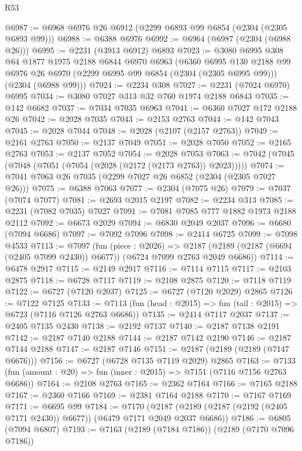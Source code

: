 \begin{lexlean}{R53}
\begin{coremodule}
@6987 := @6968 @6976 @26 @6912 (@2299 @6893 @99 @6854 (@2304 (@2305 @6893 @99)))
@6988 := @6388 @6976
@6992 := @6964 (@6987 (@2304 (@6988 @26)))
@6995 := @2231 (@3913 @6912) @6893
@7023 := @3080
    @6995
    @308
    @64
    @1877
    @1975
    @2188
    @6844
    @6970
    @6963
    (@6360
      @6995
      @130
      @2188
      @99
      @6976
      @26
      @6970
      (@2299 @6995 @99 @6854 (@2304 (@2305 @6995 @99)))
      (@2304 (@6988 @99)))
@7024 := @2234 @308
@7027 := @2231 (@7024 @6970) @6995
@7034 := @3080 @7027 @313 @32 @760 @1974 @2188 @6843
@7035 := @142 @6682
@7037 := @7034 @7035 @6963
@7041 := @6360 @7027 @172 @2188 @26
@7042 := @2028 @7035
@7043 := @2153 @2763
@7044 := @142 @7043
@7045 := @2028 @7044
@7048 := @2028 (@2107 (@2157 @2763))
@7049 := @2161 @2763
@7050 := @2137 @7049
@7051 := @2028 @7050
@7052 := @2165 @2763
@7053 := @2137 @7052
@7054 := @2028 @7053
@7063 := @7042 (@7045 (@7048 (@7051 (@7054 (@2028 (@2172 (@2173 @2763)) @2023)))))
@7074 := @7041 @7063 @26 @7035 (@2299 @7027 @26 @6852 (@2304 (@2305 @7027 @26)))
@7075 := @6388 @7063
@7077 := @2304 (@7075 @26)
@7079 := @7037 (@7074 @7077)
@7081 := @2693 @2015 @2197
@7082 := @2234 @313
@7085 := @2231 (@7082 @7035) @7027
@7091 := @7081 @7085 @777 @1882 @1973 @2188 @2112
@7092 := @6673 @2029
@7094 := @6830 @2049 @2037
@7096 := @6680 (@7094 @6686)
@7097 := @7092 @7096
@7098 := @2414 @6725
@7099 := @7098 @4533
@7113 := @7097
    (fun (piece : @2026) =>
    @2187 (@2189 (@2187 (@6694 (@2405 @7099 @2430)) @6677)) (@6724 @7099 @2763 @2049 @6686))
@7114 := @6478 @2917
@7115 := @2149 @2917
@7116 := @7114 @7115
@7117 := @2103 @2875
@7118 := @6728 @7117
@7119 := @2108 @2875
@7120 := @7118 @7119
@7122 := @6727 (@7120 @2037)
@7125 := @6727 (@7120 @2029) @2865
@7126 := @7122 @7125
@7133 := @7113 (fun (head : @2015) => fun (tail : @2015) => @6723 (@7116 @7126 @2763 @6686))
@7135 := @2414 @7117 @2037
@7137 := @2405 @7135 @2430
@7138 := @2192 @7137
@7140 := @2187 @7138 @2191
@7142 := @2187 @7140 @2188
@7144 := @2187 @7142 @2190
@7146 := @2187 @7144 @2188
@7147 := @2187 @7146
@7151 := @2187 (@2189 (@2189 (@7147 @6676)))
@7156 := @6727 (@6728 @7135 @7119 @2029) @2865
@7163 := @7133 (fun (amount : @20) => fun (inner : @2015) => @7151 (@7116 @7156 @2763 @6686))
@7164 := @2108 @2763
@7165 := @2362 @7164
@7166 := @7165 @2188
@7167 := @2360 @7166
@7169 := @2381 @7164 @2188
@7170 := @7167 @7169
@7171 := @6695 @99
@7184 := @7170
    (@2187 (@2189 (@2187 (@2192 (@2405 @7171 @2430)) @6677)) (@6479 @7171 @2049 @2037 @6686))
@7186 := @6805 (@7094 @6807)
@7193 := @7163 (@2189 (@7184 @7186)) (@2189 (@7170 @7096 @7186))

\end{coremodule}
\end{lexlean}
